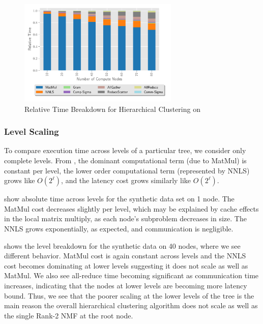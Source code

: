 \begin{figure}
\begin{center}
\includegraphics[height=2in, width=\columnwidth]{plots/realworld_hier_strongscaling.pdf}
\caption{Relative Time Breakdown for Hierarchical Clustering on \image{}}
\label{fig:rwhierstrongscaling}
\end{center}
\end{figure}

\subsubsection{Level Scaling}

To compare execution time across levels of a particular tree, we consider only complete levels. 
From , the dominant computational term (due to MatMul) is constant per level, the lower order 
computational term (represented by NNLS) grows like $O(2^\ell)$, and the latency cost grows similarly like $O(2^\ell)$. 

 show absolute time across levels for the synthetic data set on 1 node.
The MatMul cost decreases slightly per level, which may be explained by cache effects in the local matrix multiply, as each node's subproblem decreases in size. 
The NNLS grows exponentially, as expected, and communication is negligible.

 shows the level breakdown for the synthetic data on 40 nodes, where we see different behavior.
MatMul cost is again constant across levels and the NNLS cost becomes dominating at lower levels suggesting it does not scale as well as MatMul. 
We also see all-reduce time becoming significant as communication time increases, indicating that the nodes at lower levels are becoming more latency bound.
Thus, we see that the poorer scaling at the lower levels of the tree is the main reason the overall hierarchical clustering algorithm does not scale as well as the single Rank-2 NMF at the root node.

